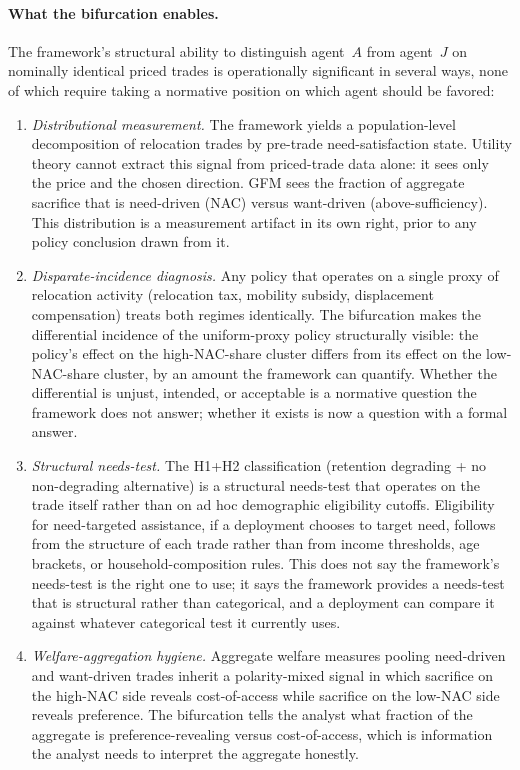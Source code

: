 \paragraph{What the bifurcation enables.}
The framework's structural ability to distinguish agent~$A$
from agent~$J$ on nominally identical priced trades is
operationally significant in several ways, none of which
require taking a normative position on which agent should be
favored:

\begin{enumerate}
\item \emph{Distributional measurement.}  The framework yields
  a population-level decomposition of relocation trades by
  pre-trade need-satisfaction state.  Utility theory cannot
  extract this signal from priced-trade data alone: it sees
  only the price and the chosen direction.  GFM sees the
  fraction of aggregate sacrifice that is need-driven (NAC)
  versus want-driven (above-sufficiency).  This distribution
  is a measurement artifact in its own right, prior to any
  policy conclusion drawn from it.
\item \emph{Disparate-incidence diagnosis.}  Any policy that
  operates on a single proxy of relocation activity
  (relocation tax, mobility subsidy, displacement
  compensation) treats both regimes identically.  The
  bifurcation makes the differential incidence of the
  uniform-proxy policy structurally visible: the policy's
  effect on the high-NAC-share cluster differs from its effect
  on the low-NAC-share cluster, by an amount the framework
  can quantify.  Whether the differential is unjust, intended,
  or acceptable is a normative question the framework does
  not answer; whether it exists is now a question with a
  formal answer.
\item \emph{Structural needs-test.}  The H1+H2 classification
  (retention degrading + no non-degrading alternative) is a
  structural needs-test that operates on the trade itself
  rather than on ad hoc demographic eligibility cutoffs.
  Eligibility for need-targeted assistance, if a deployment
  chooses to target need, follows from the structure of each
  trade rather than from income thresholds, age brackets, or
  household-composition rules.  This does not say the
  framework's needs-test is the right one to use; it says the
  framework provides a needs-test that is structural rather
  than categorical, and a deployment can compare it against
  whatever categorical test it currently uses.
\item \emph{Welfare-aggregation hygiene.}  Aggregate welfare
  measures pooling need-driven and want-driven trades inherit
  a polarity-mixed signal in which sacrifice
  on the high-NAC side reveals cost-of-access while sacrifice
  on the low-NAC side reveals preference.  The bifurcation
  tells the analyst what fraction of the aggregate is
  preference-revealing versus cost-of-access, which is
  information the analyst needs to interpret the aggregate
  honestly.
\end{enumerate}

